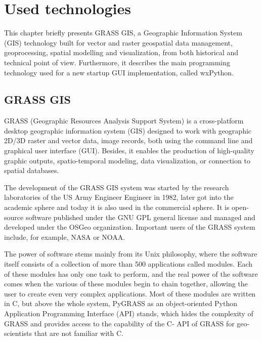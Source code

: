 \documentclass[a4paper,10pt,twoside]{article}
\begin{document}
\newpage
\vspace*{-1cm}
\section{Used technologies}
\noindent
\large

\noindent This chapter briefly presents GRASS GIS, a Geographic Information System (GIS) technology built for vector and raster geospatial data management, geoprocessing, spatial modelling and visualization, from both historical and technical point of view. Furthermore, it describes the main programming technology used for a new startup GUI implementation, called wxPython.

\subsection{GRASS GIS}
\noindent
\large

\noindent GRASS (Geographic Resources Analysis Support System) is a cross-platform desktop geographic information system (GIS) designed to work with geographic 2D/3D raster and vector data, image records, both using the command line and graphical user interface (GUI). Besides, it enables the production of high-quality graphic outputs, spatio-temporal modeling, data visualization, or connection to spatial databases.

The development of the GRASS GIS system was started by the research laboratories of the US Army Engineer Engineer in 1982, later got into the academic sphere and today it is also used in the commercial sphere. It is open-source software published under the GNU GPL general license and managed and developed under the OSGeo organization. Important users of the GRASS system include, for example, NASA or NOAA.

The power of software stems mainly from its Unix philosophy, where the software itself consists of a collection of more than 500 applications called modules. Each of these modules has only one task to perform, and the real power of the software comes when the various of these modules begin to chain together, allowing the user to create even very complex applications. Most of these modules are written in C, but above the whole system, PyGRASS as an object-oriented Python Application Programming Interface (API) stands, which hides the complexity of GRASS and provides access to the capability of the C- API of GRASS for geo-scientists that are not familiar with C.
\end{document}
